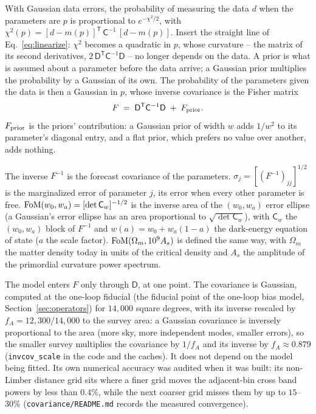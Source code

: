\documentclass[11pt]{article}
\newcommand{\Cov}{\mathsf{C}}
\newcommand{\T}{^{\mathsf{T}}}
\newcommand{\mD}{\mathsf{D}}
\newcommand{\us}{\_\allowbreak}
\begin{document}
With Gaussian data errors, the probability of measuring the data $d$
when the parameters are $p$ is proportional to $e^{-\chi^2/2}$, with
$\chi^2(p) = [d - m(p)]\T\,\Cov^{-1}\,[d - m(p)]$.  Insert the
straight line of Eq.~\eqref{eq:linearize}: $\chi^2$ becomes a
quadratic in $p$, whose curvature -- the matrix of its second
derivatives, $2\,\mD\T\Cov^{-1}\mD$ -- no longer depends on the data.
A prior is what is assumed about a parameter before the data arrive;
a Gaussian prior multiplies the probability by a Gaussian of its own.
The probability of the parameters given the data
is then a Gaussian in $p$, whose inverse covariance is the Fisher matrix
\begin{equation}
  F \;=\; \mD\T \Cov^{-1} \mD \;+\; F_{\rm prior} .
  \label{eq:fisher}
\end{equation}
$F_{\rm prior}$ is the priors' contribution: a Gaussian prior of width
$w$ adds $1/w^2$ to its parameter's diagonal entry, and a flat prior,
which prefers no value over another, adds nothing.

The inverse $F^{-1}$ is the forecast covariance of the parameters.
$\sigma_j = [(F^{-1})_{jj}]^{1/2}$ is the marginalized error of
parameter $j$, its error when every other parameter is free.
${\rm FoM}(w_0, w_a) = [\det \Cov_w]^{-1/2}$ is the inverse area of the
$(w_0, w_a)$ error ellipse (a Gaussian's error ellipse has an area
proportional to $\sqrt{\det \Cov_w}$), with $\Cov_w$ the $(w_0, w_a)$ block of
$F^{-1}$ and $w(a) = w_0 + w_a(1 - a)$ the dark-energy equation of state
($a$ the scale factor).  ${\rm FoM}(\Omega_m, 10^9 A_s)$ is defined the
same way, with $\Omega_m$ the matter density today in units of the
critical density and $A_s$ the amplitude of the primordial curvature
power spectrum.

The model enters $F$ only through $\mD$, at one point.  The covariance
is Gaussian, computed at the one-loop fiducial (the fiducial point of the
one-loop bias model, Section~\ref{sec:operators}) for $14{,}000$ square
degrees, with its inverse rescaled by $f_A = 12{,}300/14{,}000$ to the
survey area: a Gaussian covariance is inversely proportional to the
area (more sky, more independent modes, smaller errors), so the
smaller survey multiplies the covariance by $1/f_A$ and its inverse by
$f_A \approx 0.879$ (\texttt{invcov\us scale} in the code and the
caches).  It does not depend on the model being fitted.  Its own
numerical accuracy was audited when it was built: its non-Limber
distance grid sits where a finer grid moves the adjacent-bin cross band
powers by less than $0.4\%$, while the next coarser grid misses them by
up to $15$--$30\%$ (\texttt{covariance/README.md} records the measured
convergence).
\end{document}
